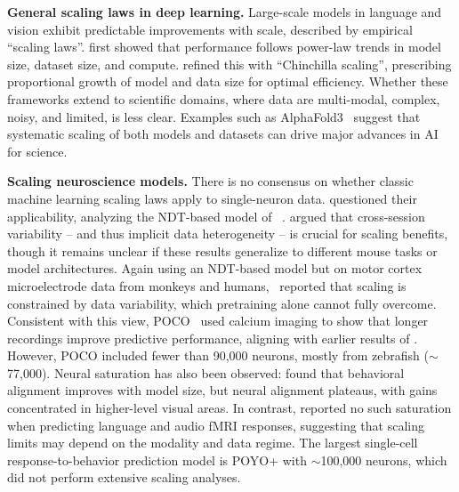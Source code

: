 \documentclass{article} %
\begin{document}
\textbf{General scaling laws in deep learning.}
Large-scale models in language and vision exhibit predictable improvements with scale, described by empirical ``scaling laws''. 
\citet{kaplan2020scaling} first showed that performance follows power-law trends in model size, dataset size, and compute. \citet{hoffmann2022training} refined this with ``Chinchilla scaling'', prescribing proportional growth of model and data size for optimal efficiency. 
Whether these frameworks extend to scientific domains, where data are multi-modal, complex, noisy, and limited, is less clear. 
Examples such as AlphaFold3~\citep{abramson2024accurate} suggest that systematic scaling of both models and datasets can drive major advances in AI for science.

\textbf{Scaling neuroscience models.}
There is no consensus on whether classic machine learning scaling laws apply to single-neuron data. 
\citet{jiang2025data} questioned their applicability, analyzing the NDT-based model of ~\citet{universalspiketranslator}.
\citet{jiang2025data} argued that cross-session variability -- and thus implicit data heterogeneity -- is crucial for scaling benefits, though it remains unclear if these results generalize to different mouse tasks or model architectures. 
Again using an NDT-based model but on motor cortex microelectrode data from monkeys and humans,~\citet{ye2025generalist} reported that scaling is constrained by data variability, which pretraining alone cannot fully overcome. 
Consistent with this view, POCO~\citep{duan2025poco} used calcium imaging to show that longer recordings improve predictive performance, aligning with earlier results of \citet{lurz2020generalization}. However, POCO included fewer than 90,000 neurons, mostly from zebrafish ($\sim$77,000). 
Neural saturation has also been observed: \citet{gokce2024scaling} found that behavioral alignment improves with model size, but neural alignment plateaus, with gains concentrated in higher-level visual areas. 
In contrast, \citet{antonello2023scaling} reported no such saturation when predicting language and audio fMRI responses, suggesting that scaling limits may depend on the modality and data regime. 
The largest single-cell response-to-behavior prediction model is POYO+ \cite{poyov2iclr2025} with $\sim$100,000 neurons, which did not perform extensive scaling analyses.
\end{document}
